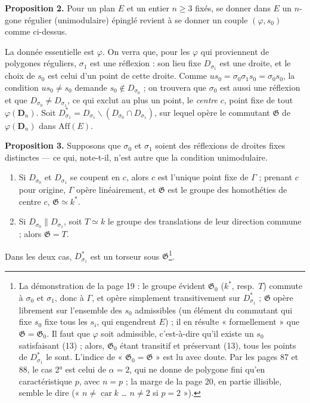 \documentclass[11pt,a4paper]{article}
\begin{document}
\textbf{Proposition 2.} Pour un plan $E$ et un entier $n \geq 3$ fixés, se
donner dans $E$ un $n$-gone régulier (unimodulaire) épinglé revient à se donner
un couple $(\varphi, s_0)$ comme ci-dessus.

La donnée essentielle est $\varphi$. On verra que, pour les $\varphi$ qui
proviennent de polygones réguliers, $\sigma_1$ est une réflexion : son lieu
fixe $D_{\sigma_1}$ est une droite, et le choix de $s_0$ est celui d'un point
de cette droite. Comme $u s_0 = \sigma_0 \sigma_1 s_0 = \sigma_0 s_0$, la
condition $u s_0 \neq s_0$ demande $s_0 \notin D_{\sigma_0}$ ; on trouvera que
$\sigma_0$ est aussi une réflexion et que $D_{\sigma_0} \neq D_{\sigma_1}$,
ce qui exclut au plus un point, le \emph{centre} $c$, point fixe de tout
$\varphi(\mathbf{D}_n)$. Soit $D_{\sigma_1}^{*} = D_{\sigma_1} \smallsetminus
(D_{\sigma_0} \cap D_{\sigma_1})$, sur lequel opère le commutant $\mathfrak{G}$
de $\varphi(\mathbf{D}_n)$ dans $\mathrm{Aff}(E)$.

\textbf{Proposition 3.} Supposons que $\sigma_0$ et $\sigma_1$ soient des
réflexions de droites fixes distinctes --- ce qui, note-t-il, n'est autre que
la condition unimodulaire.
\begin{enumerate}
  \item[1°)] Si $D_{\sigma_0}$ et $D_{\sigma_1}$ se coupent en $c$, alors $c$
    est l'unique point fixe de $\Gamma$ ; prenant $c$ pour origine, $\Gamma$
    opère linéairement, et $\mathfrak{G}$ est le groupe des homothéties de
    centre $c$, $\mathfrak{G} \simeq k^{*}$.
  \item[2°)] Si $D_{\sigma_0} \parallel D_{\sigma_1}$, soit $T \simeq k$ le
    groupe des translations de leur direction commune ; alors $\mathfrak{G} =
    T$.
\end{enumerate}
Dans les deux cas, $D_{\sigma_1}^{*}$ est un torseur sous
$\mathfrak{G}$\footnote{La démonstration de la page 19 : le groupe évident
$\mathfrak{G}_0$ ($k^{*}$, resp.\ $T$) commute à $\sigma_0$ et $\sigma_1$,
donc à $\Gamma$, et opère simplement transitivement sur $D_{\sigma_1}^{*}$ ;
$\mathfrak{G}$ opère librement sur l'ensemble des $s_0$ admissibles (un
élément du commutant qui fixe $s_0$ fixe tous les $s_i$, qui engendrent $E$) ;
il en résulte « formellement » que $\mathfrak{G} = \mathfrak{G}_0$. Il faut
que $\varphi$ soit admissible, c'est-à-dire qu'il existe un $s_0$ satisfaisant
(13) ; alors, $\mathfrak{G}_0$ étant transitif et préservant (13), tous les
points de $D_{\sigma_1}^{*}$ le sont. L'indice de « $\mathfrak{G}_0 =
\mathfrak{G}$ » est lu avec doute. Par les pages 87 et 88, le cas 2° est
celui de $\alpha = 2$, qui ne donne de polygone fini qu'en caractéristique
$p$, avec $n = p$ ; la marge de la page 20, en partie illisible, semble le
dire (« $n \neq \operatorname{car} k$ \ldots{} $n \neq 2$ si $p = 2$
»).}.
\end{document}
